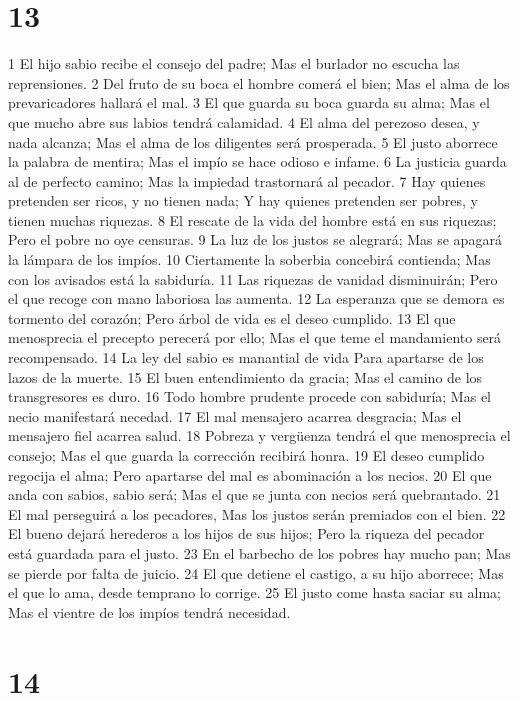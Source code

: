 \chapter{13}

1 El hijo sabio recibe el consejo del padre;
Mas el burlador no escucha las reprensiones.
2 Del fruto de su boca el hombre comerá el bien;
Mas el alma de los prevaricadores hallará el mal.
3 El que guarda su boca guarda su alma;
Mas el que mucho abre sus labios tendrá calamidad.
4 El alma del perezoso desea, y nada alcanza;
Mas el alma de los diligentes será prosperada.
5 El justo aborrece la palabra de mentira;
Mas el impío se hace odioso e infame.
6 La justicia guarda al de perfecto camino;
Mas la impiedad trastornará al pecador.
7 Hay quienes pretenden ser ricos, y no tienen nada;
Y hay quienes pretenden ser pobres, y tienen muchas riquezas.
8 El rescate de la vida del hombre está en sus riquezas;
Pero el pobre no oye censuras.
9 La luz de los justos se alegrará;
Mas se apagará la lámpara de los impíos.
10 Ciertamente la soberbia concebirá contienda;
Mas con los avisados está la sabiduría.
11 Las riquezas de vanidad disminuirán;
Pero el que recoge con mano laboriosa las aumenta.
12 La esperanza que se demora es tormento del corazón;
Pero árbol de vida es el deseo cumplido.
13 El que menosprecia el precepto perecerá por ello;
Mas el que teme el mandamiento será recompensado.
14 La ley del sabio es manantial de vida
Para apartarse de los lazos de la muerte.
15 El buen entendimiento da gracia;
Mas el camino de los transgresores es duro.
16 Todo hombre prudente procede con sabiduría;
Mas el necio manifestará necedad.
17 El mal mensajero acarrea desgracia;
Mas el mensajero fiel acarrea salud.
18 Pobreza y vergüenza tendrá el que menosprecia el consejo;
Mas el que guarda la corrección recibirá honra.
19 El deseo cumplido regocija el alma;
Pero apartarse del mal es abominación a los necios.
20 El que anda con sabios, sabio será;
Mas el que se junta con necios será quebrantado.
21 El mal perseguirá a los pecadores,
Mas los justos serán premiados con el bien.
22 El bueno dejará herederos a los hijos de sus hijos;
Pero la riqueza del pecador está guardada para el justo.
23 En el barbecho de los pobres hay mucho pan;
Mas se pierde por falta de juicio.
24 El que detiene el castigo, a su hijo aborrece;
Mas el que lo ama, desde temprano lo corrige.
25 El justo come hasta saciar su alma;
Mas el vientre de los impíos tendrá necesidad.

\chapter{14}


